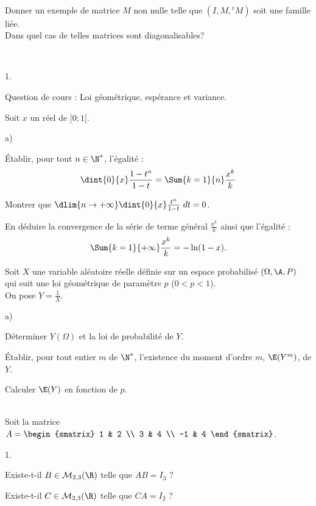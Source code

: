 \documentclass[11pt]{article}%
\begin{document}
\begin{exerciceSP}~\\
  Donner un exemple de matrice $M$ non nulle telle que $(I , M , {}^t
  M)$ soit une famille liée. \\
  Dans quel cas de telles matrices sont diagonalisables?
\end{exerciceSP}

\newpage

\begin{exerciceAP}~
  \begin{noliste}{1.}
    \setlength{\itemsep}{2mm}
  \item Question de cours : Loi géométrique, espérance et variance.
  \item Soit $x$ un réel de $]0 ; 1[$.
    \begin{noliste}{a)}
    \setlength{\itemsep}{2mm} 
    \item Établir, pour tout $n \in \N^*$, l'égalité :
      \[
      \dint{0}{x} \frac{1-t^n}{1-t} = \Sum{k=1}{n} \frac{x^k}{k}
      \]
    \item Montrer que $\dlim{n \rightarrow +\infty} \dint{0}{x}
      \frac{t^n}{1-t}\ dt = 0$.
    \item En déduire la convergence de la série de terme général
      $\frac{x^k}{k}$ ainsi que l'égalité :
      \[
      \Sum{k=1}{+\infty} \frac{x^k}{k} = - \ln (1-x).
      \]
    \end{noliste}
  \item Soit $X$ une variable aléatoire réelle définie sur un espace
    probabilisé $(\Omega , \A , P)$ qui suit une loi
    géométrique de paramètre $p$ ($0<p<1$). \\
    On pose $Y = \frac{1}{X}$.
    \begin{noliste}{a)}
    \setlength{\itemsep}{2mm}
    \item Déterminer $Y(\Omega)$ et la loi de probabilité de $Y$.
    \item Établir, pour tout entier $m$ de $\N^*$, l'existence du
      moment d'ordre $m$, $\E(Y^m)$, de $Y$.
    \item Calculer $\E(Y)$ en fonction de $p$.
    \end{noliste}
  \end{noliste}
\end{exerciceAP}


\begin{exerciceSP}~\\
  Soit la matrice $A = 
  \begin{smatrix} 
    1 & 2 \\ 
    3 & 4 \\ 
    -1 & 4
  \end{smatrix}$.
  \begin{noliste}{1.}
    \setlength{\itemsep}{2mm}
  \item Existe-t-il $B \in \mathcal{M}_{2,3} (\R)$ telle que $AB =
    I_3$ ?
  \item Existe-t-il $C \in \mathcal{M}_{2,3} (\R)$ telle que $CA =
    I_2$ ?
  \end{noliste}
\end{exerciceSP}
\end{document}
